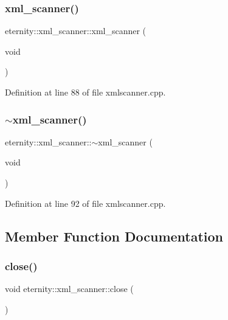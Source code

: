 \subsubsection{\texorpdfstring{xml\+\_\+scanner()}{xml\_scanner()}}
{\footnotesize\ttfamily eternity\+::xml\+\_\+scanner\+::xml\+\_\+scanner (\begin{DoxyParamCaption}\item[{void}]{ }\end{DoxyParamCaption})}



Definition at line 88 of file xmlscanner.\+cpp.

\mbox{\label{classeternity_1_1xml__scanner_a32ad22476378295dddbc6e6632087111}} 
\subsubsection{\texorpdfstring{$\sim$xml\+\_\+scanner()}{~xml\_scanner()}}
{\footnotesize\ttfamily eternity\+::xml\+\_\+scanner\+::$\sim$xml\+\_\+scanner (\begin{DoxyParamCaption}\item[{void}]{ }\end{DoxyParamCaption})}



Definition at line 92 of file xmlscanner.\+cpp.



\subsection{Member Function Documentation}
\mbox{\label{classeternity_1_1xml__scanner_a7ea884c9c01bd7efe14c49c341b07757}} 
\subsubsection{\texorpdfstring{close()}{close()}}
{\footnotesize\ttfamily void eternity\+::xml\+\_\+scanner\+::close (\begin{DoxyParamCaption}{ }\end{DoxyParamCaption})}



